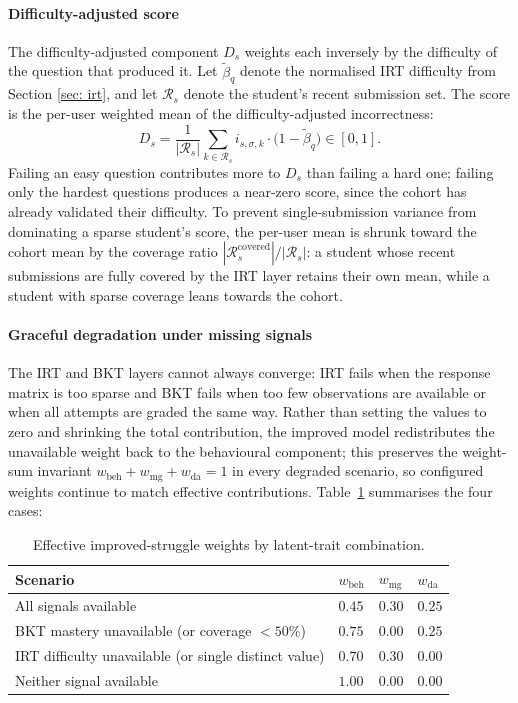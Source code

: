 \paragraph{Difficulty-adjusted score}
The difficulty-adjusted component $D_s$ weights each inversely by the difficulty of the question that produced it. 
Let $\tilde{\beta}_q$ denote the normalised IRT difficulty from Section \ref{sec: irt}, and let $\mathcal{R}_s$ denote the student's recent submission set. 
The score is the per-user weighted mean of the difficulty-adjusted incorrectness:
\begin{equation*}
    D_s
    = \frac{1}{|\mathcal{R}_s|} \sum_{k \in \mathcal{R}_s} i_{s,\sigma,k} \cdot \big(1 - \tilde{\beta}_q\big) \in [0, 1].
\end{equation*}
Failing an easy question contributes more to $D_s$ than failing a hard one; failing only the hardest questions produces a near-zero score, since the cohort has already validated their difficulty. 
To prevent single-submission variance from dominating a sparse student's score, the per-user mean is shrunk toward the cohort mean by the coverage ratio $|\mathcal{R}_s^{\mathrm{covered}}|/|\mathcal{R}_s|$: a student whose recent submissions are fully covered by the IRT layer retains their own mean, while a student with sparse coverage leans towards the cohort.

\paragraph{Graceful degradation under missing signals}
The IRT and BKT layers cannot always converge: IRT fails when the response matrix is too sparse and BKT fails when too few observations are available or when all attempts are graded the same way. 
Rather than setting the values to zero and shrinking the total contribution, the improved model redistributes the unavailable weight back to the behavioural component; this preserves the weight-sum invariant $w_{\mathrm{beh}} + w_{\mathrm{mg}} + w_{\mathrm{da}} = 1$ in every degraded scenario, so configured weights continue to match effective contributions. 
Table~\ref{tab: improved struggle degradation} summarises the four cases:
\begin{table}[H]
    \centering
    \begin{tabular}{|p{}|p{}|p{}|p{}|}
    \hline
    \textbf{Scenario} & $w_{\mathrm{beh}}$ & $w_{\mathrm{mg}}$ & $w_{\mathrm{da}}$ \\
    \hline
    All signals available & $0.45$ & $0.30$ & $0.25$ \\
    \hline
    BKT mastery unavailable (or coverage $< 50\%$) & $0.75$ & $0.00$ & $0.25$ \\
    \hline
    IRT difficulty unavailable (or single distinct value) & $0.70$ & $0.30$ & $0.00$ \\
    \hline
    Neither signal available & $1.00$ & $0.00$ & $0.00$ \\
    \hline
    \end{tabular}
    \caption{Effective improved-struggle weights by latent-trait combination.}
    \label{tab: improved struggle degradation}
\end{table}

